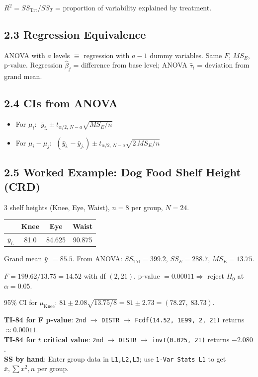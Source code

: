 \documentclass[9pt,letterpaper]{article}
\begin{document}
$R^2 = SS_{\text{Trt}}/SS_T$ = proportion of variability explained by treatment.

\subsection{2.3 Regression Equivalence}
ANOVA with $a$ levels $\equiv$ regression with $a-1$ dummy variables. Same $F$, $MS_E$, p-value. Regression $\hat\beta_j$ = difference from base level; ANOVA $\hat\tau_i$ = deviation from grand mean.

\subsection{2.4 CIs from ANOVA}
\begin{itemize}
    \item For $\mu_i$: $\;\bar{y}_{i.} \pm t_{\alpha/2,\,N-a}\sqrt{MS_E/n}$
    \item For $\mu_i - \mu_j$: $\;(\bar{y}_{i.}-\bar{y}_{j.}) \pm t_{\alpha/2,\,N-a}\sqrt{2\,MS_E/n}$
\end{itemize}

\subsection{2.5 Worked Example: Dog Food Shelf Height (CRD)}

3 shelf heights (Knee, Eye, Waist), $n=8$ per group, $N=24$.

\begin{center}\small
\begin{tabular}{@{}lccc@{}}
\toprule
 & Knee & Eye & Waist \\
\midrule
$\bar{y}_{i.}$ & 81.0 & 84.625 & 90.875 \\
\bottomrule
\end{tabular}
\end{center}

Grand mean $\bar{y}_{..} = 85.5$. From ANOVA: $SS_{\text{Trt}}=399.2$, $SS_E=288.7$, $MS_E=13.75$.

$F = 199.62/13.75 = 14.52$ with df $(2, 21)$. p-value $= 0.00011 \Rightarrow$ reject $H_0$ at $\alpha=0.05$.

95\% CI for $\mu_{\text{Knee}}$: $81 \pm 2.08\sqrt{13.75/8} = 81 \pm 2.73 = (78.27,\; 83.73)$.

\begin{calcbox}
\textbf{TI-84 for F p-value}: \texttt{2nd} $\to$ \texttt{DISTR} $\to$ \texttt{Fcdf(14.52, 1E99, 2, 21)} returns $\approx 0.00011$.\\
\textbf{TI-84 for $t$ critical value}: \texttt{2nd} $\to$ \texttt{DISTR} $\to$ \texttt{invT(0.025, 21)} returns $-2.080$.\\
\textbf{SS by hand}: Enter group data in \texttt{L1,L2,L3}; use \texttt{1-Var Stats L1} to get $\bar{x}, \sum x^2, n$ per group.
\end{calcbox}
\end{document}
